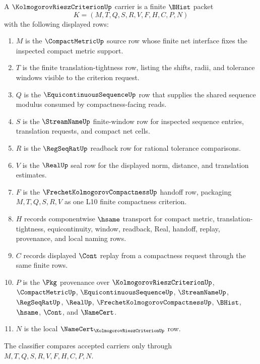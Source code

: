 \begin{definition}
\label{def:kolmogorov-riesz-criterion-carrier}
A $\KolmogorovRieszCriterionUp$ carrier is a finite $\BHist$ packet
$$
K=(M,T,Q,S,R,V,F,H,C,P,N)
$$
with the following displayed rows:
\begin{enumerate}
\item $M$ is the $\CompactMetricUp$ source row whose finite net interface fixes the inspected compact metric support.
\item $T$ is the finite translation-tightness row, listing the shifts, radii, and tolerance windows visible to the criterion request.
\item $Q$ is the $\EquicontinuousSequenceUp$ row that supplies the shared sequence modulus consumed by compactness-facing reads.
\item $S$ is the $\StreamNameUp$ finite-window row for inspected sequence entries, translation requests, and compact net cells.
\item $R$ is the $\RegSeqRatUp$ readback row for rational tolerance comparisons.
\item $V$ is the $\RealUp$ seal row for the displayed norm, distance, and translation estimates.
\item $F$ is the $\FrechetKolmogorovCompactnessUp$ handoff row, packaging $M,T,Q,S,R,V$ as one L10 finite compactness criterion.
\item $H$ records componentwise $\hsame$ transport for compact metric, translation-tightness, equicontinuity, window, readback, Real, handoff, replay, provenance, and local naming rows.
\item $C$ records displayed $\Cont$ replay from a compactness request through the same finite rows.
\item $P$ is the $\Pkg$ provenance over $\KolmogorovRieszCriterionUp$, $\CompactMetricUp$, $\EquicontinuousSequenceUp$, $\StreamNameUp$, $\RegSeqRatUp$, $\RealUp$, $\FrechetKolmogorovCompactnessUp$, $\BHist$, $\hsame$, $\Cont$, and $\NameCert$.
\item $N$ is the local $\NameCert_{\KolmogorovRieszCriterionUp}$ row.
\end{enumerate}
The classifier compares accepted carriers only through $M,T,Q,S,R,V,F,H,C,P,N$.
\end{definition}

